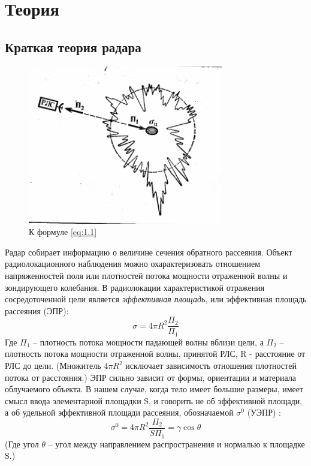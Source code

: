 \section{Теория}

\subsection{Краткая теория радара}
\begin{figure}[h!]
  \centering
  \includegraphics[width = .6\linewidth]{img/sigma0melnik.png}
  \caption{К формуле \eqref{eq:1.1}}
  \label{fig:1}
\end{figure}
Радар собирает информацию о величине сечения обратного рассеяния. 
Объект радиолокационного наблюдения можно охарактеризовать отношением напряженностей поля или плотностей потока мощности
отраженной волны и зондирующего колебания. В радиолокации характеристикой отражения сосредоточенной цели
является \textit{эффективная площадь}, или эффективная площадь рассеяния (ЭПР)\cite{meln}:
\begin{equation}
  \sigma = 4 \pi R^2 \frac{\Pi_2}{\Pi_1}
  \label{eq:1.1}
\end{equation}
Где $\Pi_1$ – плотность потока мощности падающей волны вблизи цели, а $\Pi_2$ – плотность потока мощности отраженной
волны, принятой РЛС, R - расстояние от РЛС до цели. (Множитель $4 \pi R^2$  исключает зависимость отношения плотностей потока от
расстояния.) ЭПР сильно зависит от формы, ориентации и материала облучаемого объекта. В нашем случае, когда тело имеет
большие размеры, имеет смысл ввода элементарной площадки S, и говорить не об эффективной площади, а об удельной
эффективной площади рассеяния, обозначаемой $\sigma^0$ (УЭПР) :
\begin{equation}
  \sigma^0 = 4 \pi R^2 \frac{\Pi_2}{S\Pi_1} = \gamma \cos \theta
  \label{eq:1.2}
\end{equation}
(Где угол $\theta$ – угол между направлением распространения и нормалью к площадке S.)

